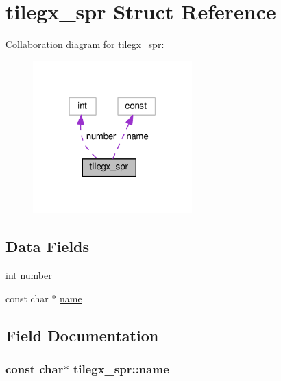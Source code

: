 \hypertarget{structtilegx__spr}{}\section{tilegx\+\_\+spr Struct Reference}
\label{structtilegx__spr}


Collaboration diagram for tilegx\+\_\+spr\+:
\nopagebreak
\begin{figure}[H]
\begin{center}
\leavevmode
\includegraphics[width=174pt]{structtilegx__spr__coll__graph}
\end{center}
\end{figure}
\subsection*{Data Fields}
\begin{DoxyCompactItemize}
\item 
\hyperlink{pcre_8txt_a42dfa4ff673c82d8efe7144098fbc198}{int} \hyperlink{structtilegx__spr_a95b0fd490de5892236070c1cb16221e9}{number}
\item 
const char $\ast$ \hyperlink{structtilegx__spr_ad39d179fe5e9779db1474ec94d3e3a16}{name}
\end{DoxyCompactItemize}


\subsection{Field Documentation}
\subsubsection[{\texorpdfstring{name}{name}}]{\setlength{\rightskip}{0pt plus 5cm}const char$\ast$ tilegx\+\_\+spr\+::name}\hypertarget{structtilegx__spr_ad39d179fe5e9779db1474ec94d3e3a16}{}\label{structtilegx__spr_ad39d179fe5e9779db1474ec94d3e3a16}
